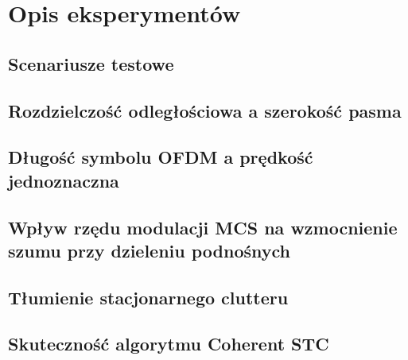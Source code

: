 \section{Opis eksperymentów}
\label{sec:simulation_results}


\subsection{Scenariusze testowe}
\label{subsec:sim_scenarios}

\subsection{Rozdzielczość odległościowa a szerokość pasma}
\label{subsec:sim_bandwidth_resolution}

\subsection{Długość symbolu OFDM a prędkość jednoznaczna}
\label{subsec:sim_doppler_aliasing}

\subsection{Wpływ rzędu modulacji MCS na wzmocnienie szumu przy dzieleniu podnośnych}
\label{subsec:sim_mcs_noise_enhancement}

\subsection{Tłumienie stacjonarnego clutteru}
\label{subsec:sim_clutter_suppression}

\subsection{Skuteczność algorytmu Coherent STC}
\label{subsec:sim_clean_performance}
